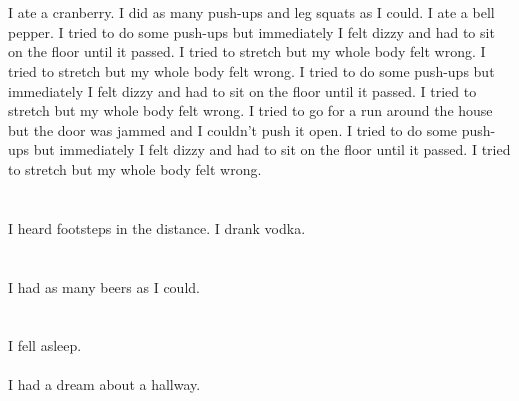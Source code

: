 \documentclass{article}
\begin{document}
    \section{}
    I ate a cranberry. I did as many push-ups and leg squats as I could. I ate a bell pepper.  I tried to do some push-ups but immediately I felt dizzy and had to sit on the floor until it passed.  I tried to stretch but my whole body felt wrong.  I tried to stretch but my whole body felt wrong.  I tried to do some push-ups but immediately I felt dizzy and had to sit on the floor until it passed.   I tried to stretch but my whole body felt wrong.  I tried to go for a run around the house but the door was jammed and I couldn't push it open.  I tried to do some push-ups but immediately I felt dizzy and had to sit on the floor until it passed.  I tried to stretch but my whole body felt wrong.  
    \newpage
    
    \section{}
    I heard footsteps in the distance. I drank vodka.  
    \newpage
    
    \section{}
    I had as many beers as I could.  
    \newpage
    
    \section{}
    I fell asleep.\\\\I had a dream about a hallway.\\\\ 
    \newpage
    
\end{document}
